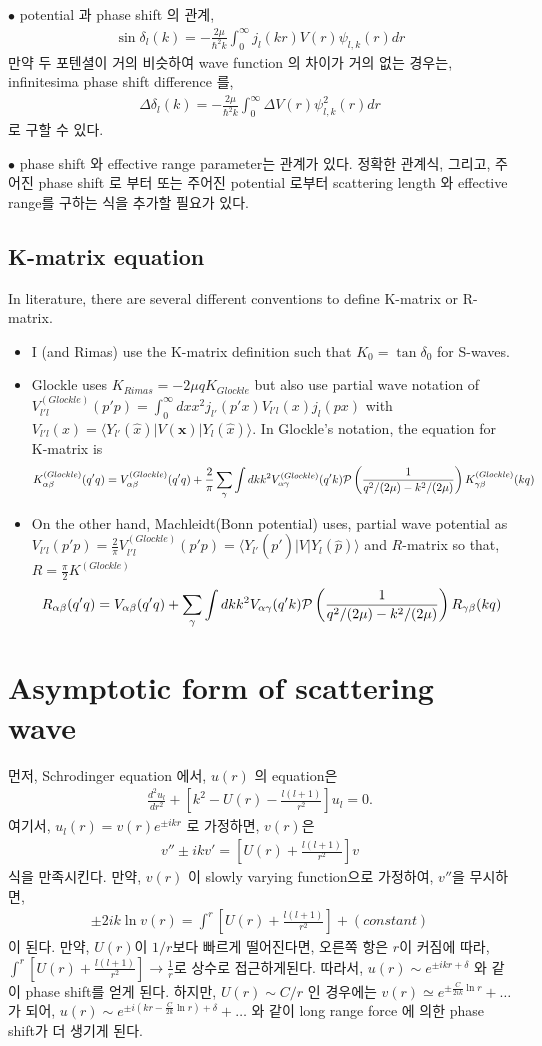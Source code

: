 \documentclass[10pt]{article}
\def\bm{\boldsymbol}
\newcommand{\bea}{\begin{eqnarray}}
\newcommand{\eea}{\end{eqnarray}}
\def\vx{{\bm x}}
\def\la{\langle}
\def\ra{\rangle}
\begin{document}
$\bullet$ potential 과 phase shift 의 관계,
\bea
\sin \delta_l(k)=-\frac{2\mu}{\hbar^2 k}\int_0^\infty j_l(kr) V(r) \psi_{l,k}(r) dr
\eea
만약 두 포텐셜이 거의 비슷하여 wave function 의 차이가 거의 없는 경우는, infinitesima
phase shift difference 를,
\bea
\Delta \delta_l(k)=-\frac{2\mu}{\hbar^2 k}\int_0^\infty \Delta V(r)\psi^2_{l,k}(r) dr
\eea
로 구할 수 있다.

$\bullet$ phase shift 와 effective range parameter는 관계가 있다. 정확한 관계식, 그리고, 
주어진 phase shift 로 부터 또는 주어진 potential 로부터 scattering length 와 effective range를 
구하는 식을 추가할 필요가 있다.

\subsection{K-matrix equation}
In literature, there are several different conventions to
define K-matrix or R-matrix.
\begin{itemize}
\item
I (and Rimas) use the K-matrix definition such that 
$K_0=\tan\delta_0$ for S-waves.
\item
Glockle uses $K_{Rimas}=-2\mu q K_{Glockle}$
but also use partial wave notation of 
$V_{l'l}^{(Glockle)}(p'p)
=\int_0^\infty dx x^2 j_{l'}(p'x) V_{l'l}(x) j_l(px)$
with $V_{l'l}(x)=\la Y_{l'}(\hat{x})|V(\vx)|Y_l(\hat{x})\ra$.
In Glockle's notation, the equation
for K-matrix is
\bea
K^{(Glockle)}_{\alpha\beta}(q'q)
=V^{(Glockle)}_{\alpha\beta}(q'q)+\frac{2}{\pi}\sum_{\gamma}\int dk k^2 
 V^{(Glockle)}_{\alpha\gamma}(q' k) {\cal P}\left(\frac{1}{q^2/(2\mu)-k^2/(2\mu)}\right)
 K^{(Glockle)}_{\gamma\beta}(kq)
\eea
\item
On the other hand, Machleidt(Bonn potential) uses,
partial wave potential as $V_{l'l}(p'p)=\frac{2}{\pi}V^{(Glockle)}_{l'l}(p'p)
=\la Y_{l'}(\hat{p'})|V|Y_{l}(\hat{p})\ra$
and $R$-matrix so that, $R=\frac{\pi}{2}K^{(Glockle)}$
\bea
R_{\alpha\beta}(q'q)
=V_{\alpha\beta}(q'q)+\sum_{\gamma}\int dk k^2 
 V_{\alpha\gamma}(q' k) {\cal P}\left(\frac{1}{q^2/(2\mu)-k^2/(2\mu)}\right)
 R_{\gamma\beta}(kq)
\eea
\end{itemize}


\section{Asymptotic form of scattering wave}
먼저, Schrodinger equation 에서, $u(r)$ 의 equation은
\bea
\frac{d^2 u_l}{dr^2}
+\left[k^2-U(r)-\frac{l(l+1)}{r^2}\right] u_l=0.
\eea
여기서, $u_l(r)=v(r) e^{\pm ikr}$ 로 가정하면, $v(r)$은 
\bea
v''\pm ik v'=\left[U(r)+\frac{l(l+1)}{r^2}\right]v
\eea
식을 만족시킨다. 만약, $v(r)$ 이 slowly varying function으로
가정하여, $v''$을 무시하면,
\bea
\pm 2ik \ln v(r)=\int^r \left[U(r)+\frac{l(l+1)}{r^2}\right]+(constant)
\eea
이 된다. 만약, $U(r)$이 $1/r$보다 빠르게 떨어진다면, 오른쪽 항은
$r$이 커짐에 따라, 
$\int^r \left[U(r)+\frac{l(l+1)}{r^2}\right]\to \frac{1}{r}$로
상수로 접근하게된다. 따라서, $u(r)\sim e^{\pm ikr+\delta}$
와 같이 phase shift를 얻게 된다. 
하지만, $U(r)\sim C/r$ 인 경우에는 
$v(r)\simeq e^{\pm \frac{C}{2ik} \ln r}+\dots$ 가 되어,
$u(r)\sim e^{\pm i(kr-\frac{C}{2k}\ln r)+\delta}+\dots$
와 같이 long range force 에 의한 phase shift가 더 생기게 된다.
\end{document}
